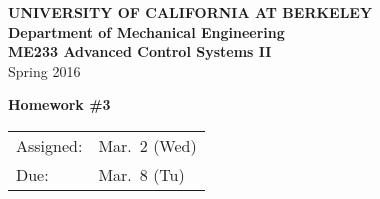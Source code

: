 \documentclass[letterpaper,12pt]{article}
\begin{document}
\begin{center}
    {\bf UNIVERSITY OF CALIFORNIA AT BERKELEY}\\
    {\bf Department of Mechanical Engineering}\\
    {\bf ME233  Advanced Control Systems II}\\
    Spring 2016\\
\end{center}
\noindent
{\Large \bf Homework \#3 }\\[-3em]
\begin{flushright}
\begin{tabular} {l l}
    Assigned: &  Mar.\ 2 (Wed)\\
    Due: & Mar.\ 8 (Tu)
\end{tabular}
\end{flushright}
\end{document}
